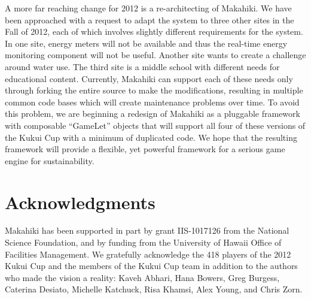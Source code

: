 \documentclass{acm_proc_article-sp}
\begin{document}
A more far reaching change for 2012 is a re-architecting of Makahiki.  We have
been approached with a request to adapt the system to three other sites in the
Fall of 2012, each of which involves slightly different requirements for the
system. In one site, energy meters will not be available and thus the real-time
energy monitoring component will not be useful. Another site wants to create a
challenge around water use.  The third site is a middle school with different
needs for educational content. Currently, Makahiki can support each of these
needs only through forking the entire source to make the modifications,
resulting in multiple common code bases which will create maintenance problems
over time.  To avoid this problem, we are beginning a redesign of Makahiki as a
pluggable framework with composable ``GameLet'' objects that will support all
four of these versions of the Kukui Cup with a minimum of duplicated code.  We
hope that the resulting framework will provide a flexible, yet powerful
framework for a serious game engine for sustainability.

\section{Acknowledgments}

Makahiki has been supported in part by grant IIS-1017126 from the National
Science Foundation, and by funding from the University of Hawaii Office of
Facilities Management.   We gratefully acknowledge the 418 players of the 2012
Kukui Cup and the members of the Kukui Cup team in addition to the authors who
made the vision a reality:  Kaveh Abhari, Hana Bowers, Greg Burgess, Caterina
Desiato, Michelle Kat\-chuck, Risa Khamsi, Alex Young, and Chris Zorn.


  

\balancecolumns
\end{document}
